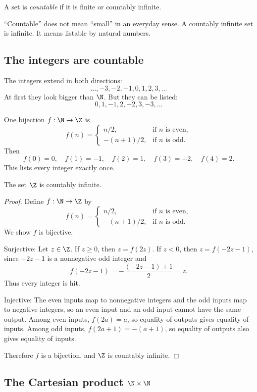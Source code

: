 A set is \emph{countable} if it is finite or countably infinite.

\begin{trapbox}
``Countable'' does not mean ``small'' in an everyday sense. A countably infinite set is infinite. It means listable by natural numbers.
\end{trapbox}

\subsection{The integers are countable}

The integers extend in both directions:
\[
\ldots,-3,-2,-1,0,1,2,3,\ldots
\]
At first they look bigger than $\N$. But they can be listed:
\[
0,1,-1,2,-2,3,-3,\ldots
\]

One bijection $f:\N\to\Z$ is
\[
f(n)=
\begin{cases}
n/2,&\text{if }n\text{ is even},\\
-(n+1)/2,&\text{if }n\text{ is odd}.
\end{cases}
\]
Then
\[
f(0)=0,\quad f(1)=-1,\quad f(2)=1,\quad f(3)=-2,\quad f(4)=2.
\]
This lists every integer exactly once.

\begin{theorem}
The set $\Z$ is countably infinite.
\end{theorem}

\begin{proof}
Define $f:\N\to\Z$ by
\[
f(n)=
\begin{cases}
n/2,&\text{if }n\text{ is even},\\
-(n+1)/2,&\text{if }n\text{ is odd}.
\end{cases}
\]
We show $f$ is bijective.

Surjective: Let $z\in\Z$. If $z\geq0$, then $z=f(2z)$. If $z<0$, then $z=f(-2z-1)$, since $-2z-1$ is a nonnegative odd integer and
\[
f(-2z-1)=-\frac{(-2z-1)+1}{2}=z.
\]
Thus every integer is hit.

Injective: The even inputs map to nonnegative integers and the odd inputs map to negative integers, so an even input and an odd input cannot have the same output. Among even inputs, $f(2a)=a$, so equality of outputs gives equality of inputs. Among odd inputs, $f(2a+1)=-(a+1)$, so equality of outputs also gives equality of inputs.

Therefore $f$ is a bijection, and $\Z$ is countably infinite.
\end{proof}

\subsection{The Cartesian product $\N\times\N$}

